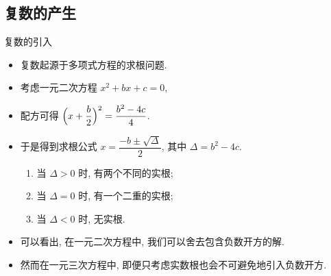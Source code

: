 \subsection{复数的产生}

\begin{frame}{复数的引入\noexer}
	\onslide<+->
	\begin{itemize}
		\item 复数起源于多项式方程的求根问题.
		\item 考虑一元二次方程 $x^2+bx+c=0$,
		\item 配方可得 $\Bigl(x+\dfrac b2\Bigr)^2=\dfrac{b^2-4c}4$.
		\item 于是得到求根公式 $x=\dfrac{-b\pm\sqrt\Delta}2$, 其中 $\Delta=b^2-4c$.
		\begin{enumerate}
			\item 当 $\Delta>0$ 时, 有两个不同的实根;
			\item 当 $\Delta=0$ 时, 有一个二重的实根;
			\item 当 $\Delta<0$ 时, 无实根.
		\end{enumerate}
		\item 可以看出, 在一元二次方程中, 我们可以舍去包含\alert{负数开方}的解.
		\item 然而在一元三次方程中, 即便只考虑实数根也会不可避免地引入负数开方.
	\end{itemize}
\end{frame}



